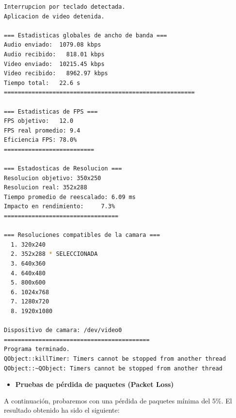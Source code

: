 \begin{adjustbox}{max width=\textwidth}
\begin{lstlisting}[language=bash,basicstyle=\ttfamily\scriptsize]
Interrupcion por teclado detectada.
Aplicacion de video detenida.

=== Estadisticas globales de ancho de banda ===
Audio enviado:	1079.08 kbps
Audio recibido:   818.01 kbps
Video enviado:	10215.45 kbps
Video recibido:   8962.97 kbps
Tiempo total: 	22.6 s
=======================================================

=== Estadisticas de FPS ===
FPS objetivo: 	12.0
FPS real promedio: 9.4
Eficiencia FPS:	78.0%
==========================

=== Estadosticas de Resolucion ===
Resolucion objetivo: 350x250
Resolucion real: 352x288
Tiempo promedio de reescalado: 6.09 ms
Impacto en rendimiento:    	7.3%
=================================

=== Resoluciones compatibles de la camara ===
  1. 320x240
  2. 352x288 * SELECCIONADA
  3. 640x360
  4. 640x480
  5. 800x600
  6. 1024x768
  7. 1280x720
  8. 1920x1080

Dispositivo de camara: /dev/video0
==========================================
Programa terminado.
QObject::killTimer: Timers cannot be stopped from another thread
QObject::~QObject: Timers cannot be stopped from another thread
\end{lstlisting}
\end{adjustbox}
\vspace{\baselineskip}

\newpage

\begin{itemize}
    \item \textbf{Pruebas de pérdida de paquetes (Packet Loss)}
\end{itemize}

A continuación, probaremos con una pérdida de paquetes mínima del 5\%. El resultado obtenido ha sido el siguiente:
\vspace{\baselineskip}

